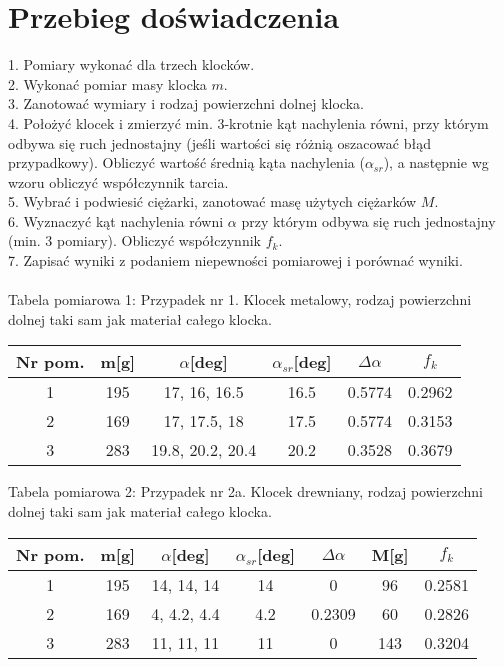\documentclass[11pt,a4paper]{article}
\begin{document}
\section{Przebieg doświadczenia}
1. Pomiary wykonać dla trzech klocków. \\
2. Wykonać pomiar masy klocka $m$. \\
3. Zanotować wymiary i rodzaj powierzchni dolnej klocka. \\
4. Położyć klocek i zmierzyć min. 3-krotnie kąt nachylenia równi, przy którym odbywa się ruch jednostajny (jeśli wartości się różnią oszacować błąd przypadkowy). Obliczyć wartość średnią kąta nachylenia ($\alpha_{sr}$), a następnie wg wzoru obliczyć współczynnik tarcia. \\
5. Wybrać i podwiesić ciężarki, zanotować masę użytych ciężarków $M$. \\
6. Wyznaczyć kąt nachylenia równi $\alpha$ przy którym odbywa się ruch jednostajny (min. 3 pomiary). Obliczyć współczynnik $f_k$. \\
7. Zapisać wyniki z podaniem niepewności pomiarowej i porównać wyniki. \\ \\
\hspace*{5mm} Tabela pomiarowa 1:
Przypadek nr 1. Klocek metalowy, rodzaj powierzchni dolnej taki sam jak materiał całego klocka.
\begin{center}
 \begin{tabular}{||c c c c c c||} 
 \hline
 Nr pom. & m[g] & $\alpha$[deg] & $\alpha_{sr}$[deg] & $\Delta \alpha$ & $f_k$ \\ [1.5ex] 
 \hline\hline
 1 & 195 & 17, 16, 16.5 & 16.5 & 0.5774 & 0.2962\\ 
 \hline
 2 & 169  & 17, 17.5, 18 & 17.5 & 0.5774 & 0.3153 \\
 \hline
 3 & 283 & 19.8, 20.2, 20.4 & 20.2 & 0.3528 & 0.3679 \\
 \hline
\end{tabular}
\end{center}

Tabela pomiarowa 2:
Przypadek nr 2a. Klocek drewniany, rodzaj powierzchni dolnej taki sam jak materiał całego klocka.
\begin{center}
 \begin{tabular}{||c c c c c c c||} 
 \hline
 Nr pom. & m[g] & $\alpha$[deg] & $\alpha_{sr}$[deg] & $\Delta \alpha$ & M[g] & $f_k$ \\ [1.5ex] 
 \hline\hline
 1 & 195 & 14, 14, 14 & 14 & 0 & 96 & 0.2581\\ 
 \hline
 2 & 169  & 4, 4.2, 4.4 & 4.2 & 0.2309 & 60 & 0.2826 \\
 \hline
 3 & 283 & 11, 11, 11 & 11 & 0 & 143 & 0.3204 \\
 \hline
\end{tabular}
\end{center}
\end{document}
